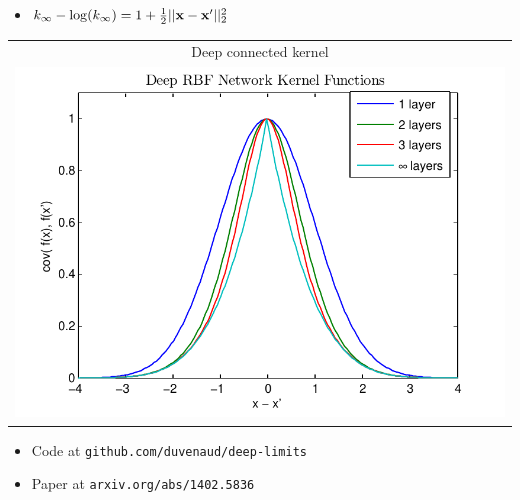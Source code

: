 \documentclass[portrait,a0b,final,a4resizeable]{include/a0poster}
\begin{document}
\begin{poster}
\begin{multicols}{2}
\begin{minipage}[c]{0.5\columnwidth}
\begin{itemize}
\item %
$k_\infty - \log(k_\infty) = 1 + \frac{1}{2} || \mathbf{x} - \mathbf{x}' ||_2^2$
\end{itemize}
\end{minipage}
\begin{minipage}[c]{0.39\columnwidth}
\begin{centering}
\begin{tabular}{c}
Deep connected kernel \\
\hspace{-0.5cm}\includegraphics[width=\columnwidth, clip, trim = 0cm 0.4cm 0.9cm 0.3cm]{../figures/deep_kernel_connected}
\end{tabular}
\end{centering}
\end{minipage}




\begin{itemize}
\item Code at \texttt{github.com/duvenaud/deep-limits}
\item Paper at \texttt{arxiv.org/abs/1402.5836}
\end{itemize}






\end{multicols}



\end{poster}
\end{document}
